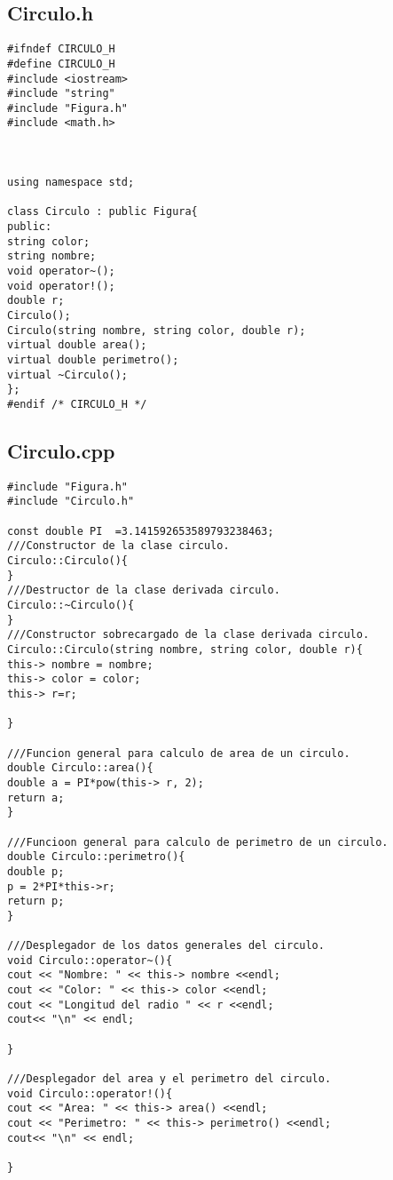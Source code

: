 \documentclass[11pt]{article}
\begin{document}
\subsection{Circulo.h}
\begin{lstlisting}
#ifndef CIRCULO_H
#define CIRCULO_H
#include <iostream>
#include "string"
#include "Figura.h"
#include <math.h> 



using namespace std;

class Circulo : public Figura{
public:
string color;
string nombre;
void operator~();
void operator!();
double r;
Circulo();
Circulo(string nombre, string color, double r);
virtual double area();
virtual double perimetro();
virtual ~Circulo();
};
#endif /* CIRCULO_H */

\end{lstlisting}

\subsection{Circulo.cpp}
\begin{lstlisting}
#include "Figura.h"
#include "Circulo.h"

const double PI  =3.141592653589793238463;
///Constructor de la clase circulo.
Circulo::Circulo(){
}
///Destructor de la clase derivada circulo.
Circulo::~Circulo(){
}
///Constructor sobrecargado de la clase derivada circulo.
Circulo::Circulo(string nombre, string color, double r){
this-> nombre = nombre;
this-> color = color;
this-> r=r;

}

///Funcion general para calculo de area de un circulo.
double Circulo::area(){
double a = PI*pow(this-> r, 2);
return a;
}

///Funcioon general para calculo de perimetro de un circulo.
double Circulo::perimetro(){
double p;
p = 2*PI*this->r;
return p;
}

///Desplegador de los datos generales del circulo.
void Circulo::operator~(){
cout << "Nombre: " << this-> nombre <<endl;
cout << "Color: " << this-> color <<endl;
cout << "Longitud del radio " << r <<endl;
cout<< "\n" << endl;

}

///Desplegador del area y el perimetro del circulo.
void Circulo::operator!(){
cout << "Area: " << this-> area() <<endl;
cout << "Perimetro: " << this-> perimetro() <<endl;
cout<< "\n" << endl;

}

\end{lstlisting}
\end{document}
